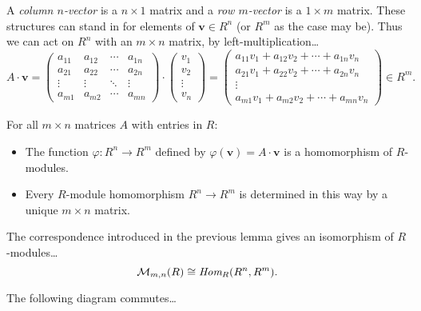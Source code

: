 A \label{vector} \emph{column $n$-vector} is a $n \times 1$ matrix and a \emph{row $m$-vector} is a $1 \times m$ matrix. These structures
can stand in for elements of $\textbf{v} \in R^n$ (or $R^m$ as the case may be). Thus we can act on $R^n$ with an $m \times n$ matrix, by
left-multiplication\dots
\[
A \cdot \textbf{v} =
\begin{pmatrix}
	a_{11} & a_{12} & \cdots & a_{1n} \\
	a_{21} & a_{22} & \cdots & a_{2n} \\
	\vdots & \vdots & \ddots & \vdots \\
	a_{m1} & a_{m2} & \cdots & a_{mn}
\end{pmatrix}
\cdot
\begin{pmatrix}
	v_{1}\\
	v_{2}\\
	\vdots\\
	v_{n}
\end{pmatrix}
=
\begin{pmatrix}
	a_{11}v_1 + a_{12}v_2 + \cdots + a_{1n}v_n\\
	a_{21}v_1 + a_{22}v_2 + \cdots + a_{2n}v_n\\
	\vdots\\
	a_{m1}v_1 + a_{m2}v_2 + \cdots + a_{mn}v_n
\end{pmatrix}
\in R^m.
\]
\begin{lemma}
For all $m \times n$ matrices $A$ with entries in $R$:
\begin{itemize}
  \item The function $\varphi : R^n \rightarrow R^m$ defined by $\varphi(\textbf{v}) = A \cdot \textbf{v}$ is a
  homomorphism of $R$-modules.
  \item Every $R$-module homomorphism $R^n \rightarrow R^m$ is determined in this way by a unique $m \times n$ matrix.
\end{itemize}
\end{lemma}

\begin{corollary}
The correspondence introduced in the previous lemma gives an isomorphism of $R$-modules\dots
$$\mathcal{M}_{m,n}(R) \cong \emph{Hom}_R(R^n,R^m).$$
\end{corollary}

\begin{lemma}
The following diagram commutes\dots
\begin{figure}[H]
\centering

\end{figure}
\end{lemma}

